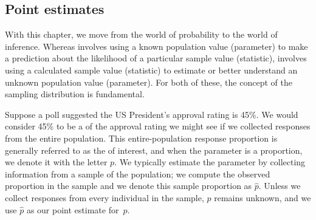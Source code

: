 


\subsection{Point estimates}

With this chapter, we move from the world of probability to the world of inference.  Whereas  involves using a known population value (parameter) to make a prediction about the likelihood of a particular sample value (statistic),  involves using a calculated sample value (statistic) to estimate or better understand an unknown population value (parameter).  For both of these, the concept of the sampling distribution is fundamental.  

Suppose a poll suggested the US President's approval
rating is 45\%.
We would consider 45\% to be a
 of the approval
rating we might see if we collected responses from the
entire population.  This entire-population response proportion is
generally referred to as the 
of interest,
and when the parameter is a proportion,
we denote it with the letter $p$. We typically estimate the parameter by collecting
information from a sample of the population;
we compute the observed proportion in the sample and we denote this sample proportion as $\hat{p}$.  Unless we collect responses from every individual in the sample,
$p$ remains unknown, and we use $\hat{p}$ as our point estimate for~$p$.

